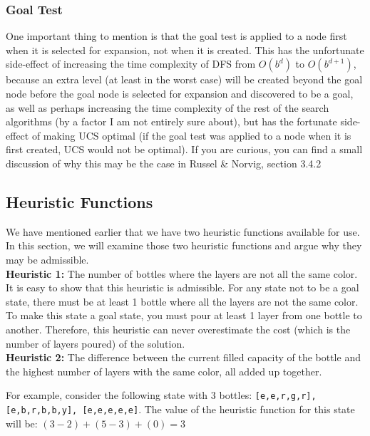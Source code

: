 \documentclass{article}
\begin{document}
\subsubsection{Goal Test}
One important thing to mention is that the goal test is applied to a node first when it is selected for expansion, not when it is created. This has the unfortunate side-effect of increasing the time complexity of DFS from $O(b^{d})$ to $O(b^{d+1})$, because an extra level (at least in the worst case) will be created beyond the goal node before the goal node is selected for expansion and discovered to be a goal, as well as perhaps increasing the time complexity of the rest of the search algorithms (by a factor I am not entirely sure about), but has the fortunate side-effect of making UCS optimal (if the goal test was applied to a node when it is first created, UCS would not be optimal). If you are curious, you can find a small discussion of why this may be the case in Russel \& Norvig, section 3.4.2

\subsection{Heuristic Functions}

We have mentioned earlier that we have two heuristic functions available for use. In this section, we will examine those two heuristic functions and argue why they may be admissible. \\

\textbf{Heuristic 1:} The number of bottles where the layers are not all the same color. \\

It is easy to show that this heuristic is admissible. For any state not to be a goal state, there must be at least 1 bottle where all the layers are not the same color. To make this state a goal state, you must pour at least 1 layer from one bottle to another. Therefore, this heuristic can never overestimate the cost (which is the number of layers poured) of the solution. \\


\textbf{Heuristic 2:} The difference between the current filled capacity of the bottle and the highest number of layers with the same color, all added up together.

For example, consider the following state with 3 bottles: \texttt{[e,e,r,g,r], [e,b,r,b,b,y], [e,e,e,e,e]}. The value of the heuristic function for this state will be: $(3 - 2) + (5 - 3) + (0) = 3$ \\
\end{document}
